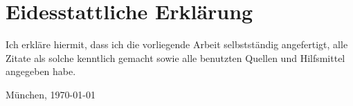 


\cleardoublepage



\cleardoublepage


\section*{Eidesstattliche Erklärung}


\noindent Ich erkläre hiermit, dass ich die vorliegende Arbeit
selbstständig angefertigt, alle Zitate als solche kenntlich gemacht
sowie alle benutzten Quellen und Hilfsmittel angegeben habe.

\vspace{7ex}
\noindent\makebox[9.3cm]{\dotfill}

\smallskip\noindent München, \today


\cleardoublepage




\cleardoublepage



\cleardoublepage
\cleardoublepage

\pagestyle{fancy}
\setcounter{page}{1}
